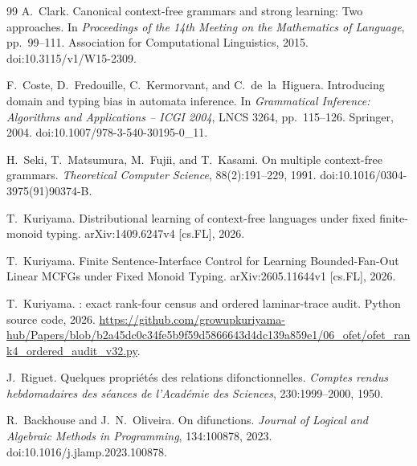 \documentclass[11pt]{article}
\begin{document}
\begin{thebibliography}{99}
A.~Clark.
Canonical context-free grammars and strong learning: Two approaches.
In \emph{Proceedings of the 14th Meeting on the Mathematics of Language},
pp.~99--111. Association for Computational Linguistics, 2015.
doi:10.3115/v1/W15-2309.

F.~Coste, D.~Fredouille, C.~Kermorvant, and C.~de~la~Higuera.
Introducing domain and typing bias in automata inference.
In \emph{Grammatical Inference: Algorithms and Applications -- ICGI 2004},
LNCS 3264, pp.~115--126. Springer, 2004.
doi:10.1007/978-3-540-30195-0\_11.

H.~Seki, T.~Matsumura, M.~Fujii, and T.~Kasami.
On multiple context-free grammars.
\emph{Theoretical Computer Science}, 88(2):191--229, 1991.
doi:10.1016/0304-3975(91)90374-B.

T.~Kuriyama.
Distributional learning of context-free languages under fixed finite-monoid typing.
arXiv:1409.6247v4 [cs.FL], 2026.

T.~Kuriyama.
Finite Sentence-Interface Control for Learning Bounded-Fan-Out Linear MCFGs
under Fixed Monoid Typing.
arXiv:2605.11644v1 [cs.FL], 2026.

T.~Kuriyama.
: exact rank-four census and ordered
laminar-trace audit.
Python source code, 2026.
\url{https://github.com/growupkuriyama-hub/Papers/blob/b2a45dc0c34fe5b9f59d5866643d4dc139a859e1/06_ofet/ofet_rank4_ordered_audit_v32.py}.

J.~Riguet.
Quelques propri\'et\'es des relations difonctionnelles.
\emph{Comptes rendus hebdomadaires des s\'eances de l'Acad\'emie des Sciences},
230:1999--2000, 1950.

R.~Backhouse and J.~N.~Oliveira.
On difunctions.
\emph{Journal of Logical and Algebraic Methods in Programming},
134:100878, 2023.
doi:10.1016/j.jlamp.2023.100878.
\end{thebibliography}
\end{document}
